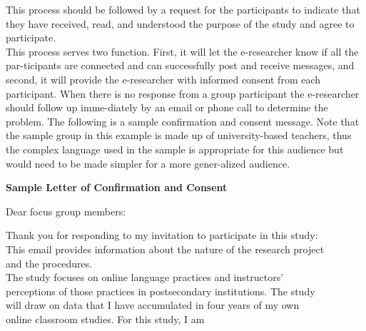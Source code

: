 \documentclass[a4]{book}
\begin{document}
\vspace*{0.3cm}
This process should be followed by a request for the participants to indicate that they have received, read, and understood the purpose of the study and agree to participate.\\ This process serves two function. First, it will let the e-researcher know if all the par-ticipants are connected and can successfully post and receive messages, and second, it will provide the e-researcher with informed consent from each participant. When there is no response from a group participant the e-researcher should follow up imme-diately by an email or phone call to determine the problem. The following is a sample confirmation and consent message. Note that the sample group in this example is made up of university-based teachers, thus the complex language used in the sample is appropriate for this audience but would need to be made simpler for a more gener-alized audience.\\

\vspace*{0.2cm}

\begin{center}
  \textbf{Sample Letter of Confirmation and Consent}\\
\end{center}

\vspace*{0.3cm}
\hspace*{0.7cm} Dear focus group members: \\
\vspace*{0.5cm}

\hspace*{0.7cm} Thank you for responding to my invitation to participate in this study:\\
\hspace*{0.7cm} This email provides information about the nature of the research project\\
\hspace*{0.7cm} and the procedures.\\

\vspace*{0.4cm}
\hspace*{0.7cm} The study focuses on online language practices and instructors' \\
\hspace*{0.7cm} perceptions of those practices in postsecondary institutions. The study \\
\hspace*{0.7cm} will draw on data that I have accumulated in four years of my own \\
\hspace*{0.7cm} online classroom studies. For this study, I am\\
\end{document}
